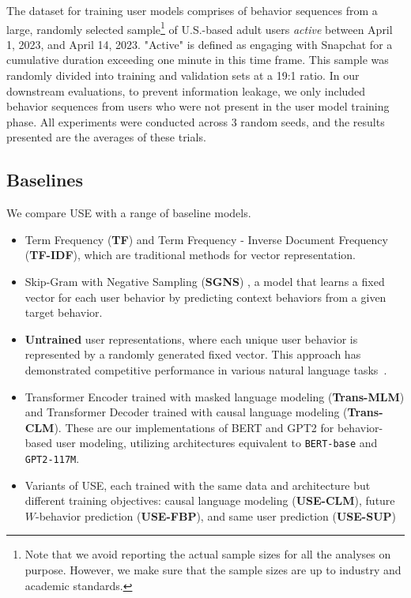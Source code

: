 \documentclass{article}
\begin{document}
The dataset for training user models comprises of behavior sequences from a large, randomly selected sample\footnote{Note that we avoid reporting the actual sample sizes for all the analyses on purpose. However, we make sure that the sample sizes are up to industry and academic standards.} of U.S.-based adult users \textit{active} between April 1, 2023, and April 14, 2023. "Active" is defined as engaging with Snapchat for a cumulative duration exceeding one minute in this time frame. This sample was randomly divided into training and validation sets at a 19:1 ratio. In our downstream evaluations, to prevent information leakage, we only included behavior sequences from users who were not present in the user model training phase. All experiments were conducted across $3$ random seeds, and the results presented are the averages of these trials. 

\subsection{Baselines}
\label{subsec:experiments_baseline}
We compare USE with a range of baseline models.
\begin{itemize}
    \item Term Frequency (\textbf{TF}) and Term Frequency - Inverse Document Frequency (\textbf{TF-IDF}), which are traditional methods for vector representation.
    \item Skip-Gram with Negative Sampling (\textbf{SGNS}) \citep{mikolov_distributed_2013}, a model that learns a fixed vector for each user behavior by predicting context behaviors from a given target behavior.
    \item \textbf{Untrained} user representations, where each unique user behavior is represented by a randomly generated fixed vector. This approach has demonstrated competitive performance in various natural language tasks~\citep{arora-etal-2020-contextual}.
    \item Transformer Encoder trained with masked language modeling (\textbf{Trans-MLM}) and Transformer Decoder trained with causal language modeling (\textbf{Trans-CLM}). These are our implementations of BERT \citep{bert} and GPT2 \citep{gpt2} for behavior-based user modeling, utilizing architectures equivalent to \texttt{BERT-base} and \texttt{GPT2-117M}.
    \item Variants of USE, each trained with the same data and architecture but different training objectives: causal language modeling (\textbf{USE-CLM}), future $W$-behavior prediction (\textbf{USE-FBP}), and same user prediction (\textbf{USE-SUP})
\end{itemize}
\end{document}
